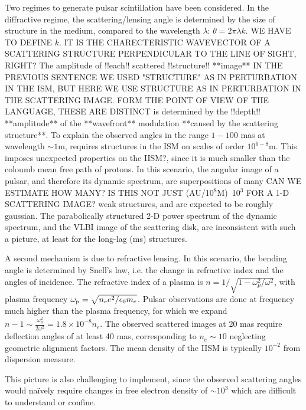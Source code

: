 \documentclass[useAMS,usenatbib]{mn2e}
\begin{document}
Two regimes to generate pulsar scintillation have been considered. In
the diffractive regime, the scattering/lensing angle is determined by
the size of structure in the medium, compared to the wavelength
$\lambda$: $\theta=2\pi\lambda k$. WE HAVE TO DEFINE $k$. IT IS THE CHARECTERISTIC WAVEVECTOR 
OF A SCATTERING STRUCTURE PERPENDICULAR TO THE LINE OF SIGHT, RIGHT?  The amplitude of !!each!! scattered
!!structure!! **image** IN THE PREVIOUS SENTENCE WE USED "STRUCTURE" AS IN PERTURBATION IN THE ISM,
BUT HERE WE USE STRUCTURE AS IN PERTURBATION IN THE SCATTERING IMAGE. FORM THE POINT OF VIEW
OF THE LANGUAGE, THESE ARE DISTINCT is determined by the !!depth!! **amplitude** of the **wavefront** modulation **caused by the scattering structure**.  To explain
the observed angles in the range $1-100$ mas at wavelength $\sim 1$m,
requires structures in the ISM on scales of order $10^{6-8}$m. This
imposes unexpected properties on the IISM?, since it is
much smaller than the coloumb mean free path of protons.  In 
this scenario, the angular image of a
pulsar, and therefore its dynamic spectrum, are superpositions of many CAN WE ESTIMATE HOW MANY?
IS THIS NOT JUST (AU/10$^8$M)~10$^3$ FOR A 1-D SCATTERING IMAGE?
weak structures, and are expected to be roughly gaussian.  The
parabolically structured 2-D power spectrum of the dynamic spectrum,
and the VLBI image of the scattering disk, are inconsistent with such
a picture, at least for the long-lag (ms) structures.

A second mechanism is due to refractive lensing.  In this scenario,
the bending angle is determined by Snell's law, i.e. the change in
refractive index and the angles of incidence.  The refractive index of
a plasma is $n=1/\sqrt{1-\omega_p^2/\omega^2}$, with plasma frequency
$\omega_{\rm p}=\sqrt{n_e e^2/\epsilon_{0}m_e}$.  Pulsar observations
are done at frequency much higher than the plasma frequency, for which
we expand $n-1 \sim \frac{\omega_p^2}{2 \omega^2} = 1.8\times 10^{-8}
n_e$.  The observed scattered images at 20 mas require deflection
angles of at least 40 mas, corresponding to $n_e \sim 10$ neglecting
geometric alignment factors.  The mean density of the IISM is
typically $10^{-2}$ from dispersion measure.


This
picture is also challenging to implement, since the observed
scattering angles would na\"ively require changes in free electron
density of $\sim 10^3$ 
which are difficult to understand or confine.
\end{document}
